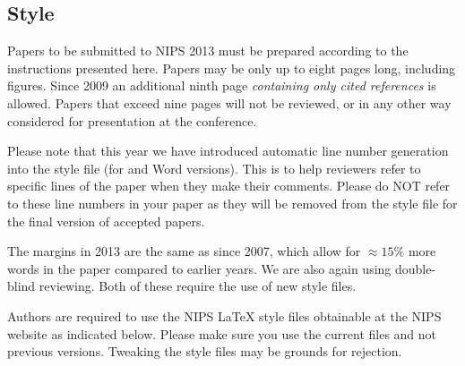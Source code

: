 \documentclass{article} %
\begin{document}
\subsection{Style}

Papers to be submitted to NIPS 2013 must be prepared according to the
instructions presented here. Papers may be only up to eight pages long,
including figures. Since 2009 an additional ninth page \textit{containing only
cited references} is allowed. Papers that exceed nine pages will not be
reviewed, or in any other way considered for presentation at the conference.

Please note that this year we have introduced automatic line number generation
into the style file (for \LaTeXe and Word versions). This is to help reviewers
refer to specific lines of the paper when they make their comments. Please do
NOT refer to these line numbers in your paper as they will be removed from the
style file for the final version of accepted papers.

The margins in 2013 are the same as since 2007, which allow for $\approx 15\%$
more words in the paper compared to earlier years. We are also again using 
double-blind reviewing. Both of these require the use of new style files.

Authors are required to use the NIPS \LaTeX{} style files obtainable at the
NIPS website as indicated below. Please make sure you use the current files and
not previous versions. Tweaking the style files may be grounds for rejection.




\end{document}
